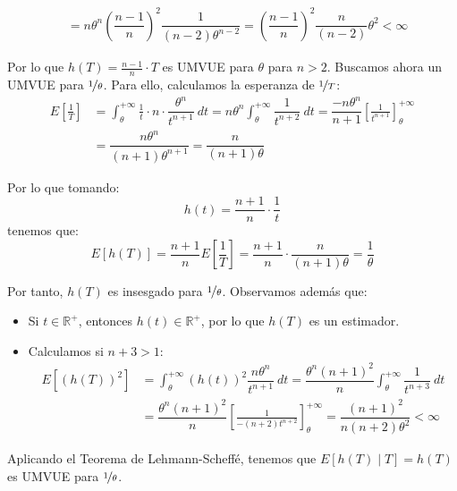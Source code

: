 \begin{ejercicio}
\begin{itemize}
\begin{align*}
                                &= n\theta^n {\left(\dfrac{n-1}{n}\right)}^{2}\dfrac{1}{(n-2)\theta^{n-2}} = {\left(\dfrac{n-1}{n}\right)}^{2} \dfrac{n}{(n-2)}\theta^2 < \infty
            \end{align*}
    \end{itemize}
    Por lo que $h(T) = \frac{n-1}{n}\cdot T$ es UMVUE para $\theta$ para $n>2$. Buscamos ahora un UMVUE para $\nicefrac{1}{\theta}$. Para ello, calculamos la esperanza de $\nicefrac{1}{T}$:
    \begin{align*}
        E\left[\frac{1}{T}\right] &= \int_{\theta}^{+\infty} \frac{1}{t}\cdot n\cdot \dfrac{\theta^n}{t^{n+1}}~dt  = n\theta^n \int_{\theta}^{+\infty} \dfrac{1}{t^{n+2}}~dt  = \dfrac{-n\theta^n}{n+1} \left[\frac{1}{t^{n+1}}\right]_\theta^{+\infty} \\
                &= \dfrac{n\theta^n}{(n+1)\theta^{n+1}} = \dfrac{n}{(n+1)\theta}
    \end{align*}

    Por lo que tomando:
    \begin{equation*}
        h(t) = \dfrac{n+1}{n}\cdot \frac{1}{t}
    \end{equation*}
    tenemos que:
    \begin{equation*}
        E[h(T)] = \dfrac{n+1}{n}E\left[\frac{1}{T}\right] = \dfrac{n+1}{n}\cdot \dfrac{n}{(n+1)\theta} = \dfrac{1}{\theta}
    \end{equation*}
    
    Por tanto, $h(T)$ es insesgado para $\nicefrac{1}{\theta}$. Observamos además que:
    \begin{itemize}
        \item Si $t\in \mathbb{R}^+$, entonces $h(t)\in \mathbb{R}^+$, por lo que $h(T)$ es un estimador.
        \item Calculamos si $n+3>1$:
            \begin{align*}
                E[{(h(T))}^{2}] &= \int_{\theta}^{+\infty} {(h(t))}^{2}\dfrac{n\theta^n}{t^{n+1}}~dt  = \dfrac{\theta^n{(n+1)}^{2}}{n}\int_{\theta}^{+\infty} \dfrac{1}{t^{n+3}}~dt  \\
                &= \dfrac{\theta^n{(n+1)}^{2}}{n} \left[\frac{1}{-(n+2)t^{n+2}}\right]_\theta^{+\infty} = \dfrac{{(n+1)}^{2}}{n(n+2)\theta^2} < \infty
            \end{align*}
    \end{itemize}
    Aplicando el Teorema de Lehmann-Scheffé, tenemos que $E[h(T)\mid T] = h(T)$ es UMVUE para $\nicefrac{1}{\theta}$.
\end{ejercicio}

